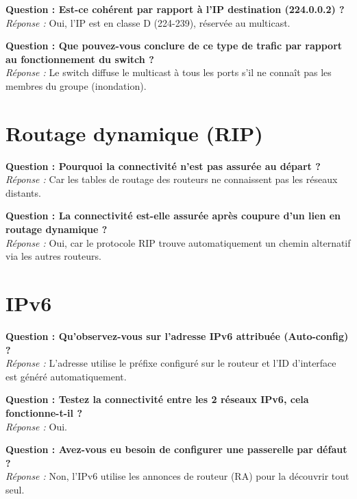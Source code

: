 \documentclass[a4paper,12pt]{article}
\begin{document}
\textbf{Question : Est-ce cohérent par rapport à l'IP destination (224.0.0.2) ?} \\
\textit{Réponse :} Oui, l'IP est en classe D (224-239), réservée au multicast.
\vspace{1em}

\textbf{Question : Que pouvez-vous conclure de ce type de trafic par rapport au fonctionnement du switch ?} \\
\textit{Réponse :} Le switch diffuse le multicast à tous les ports s'il ne connaît pas les membres du groupe (inondation).
\vspace{1em}

\section{Routage dynamique (RIP)}

\textbf{Question : Pourquoi la connectivité n'est pas assurée au départ ?} \\
\textit{Réponse :} Car les tables de routage des routeurs ne connaissent pas les réseaux distants.
\vspace{1em}

\textbf{Question : La connectivité est-elle assurée après coupure d'un lien en routage dynamique ?} \\
\textit{Réponse :} Oui, car le protocole RIP trouve automatiquement un chemin alternatif via les autres routeurs.
\vspace{1em}
\newpage
\section{IPv6}

\textbf{Question : Qu'observez-vous sur l'adresse IPv6 attribuée (Auto-config) ?} \\
\textit{Réponse :} L'adresse utilise le préfixe configuré sur le routeur et l'ID d'interface est généré automatiquement.
\vspace{1em}

\textbf{Question : Testez la connectivité entre les 2 réseaux IPv6, cela fonctionne-t-il ?} \\
\textit{Réponse :} Oui.
\vspace{1em}

\textbf{Question : Avez-vous eu besoin de configurer une passerelle par défaut ?} \\
\textit{Réponse :} Non, l'IPv6 utilise les annonces de routeur (RA) pour la découvrir tout seul.
\vspace{1em}
\end{document}
